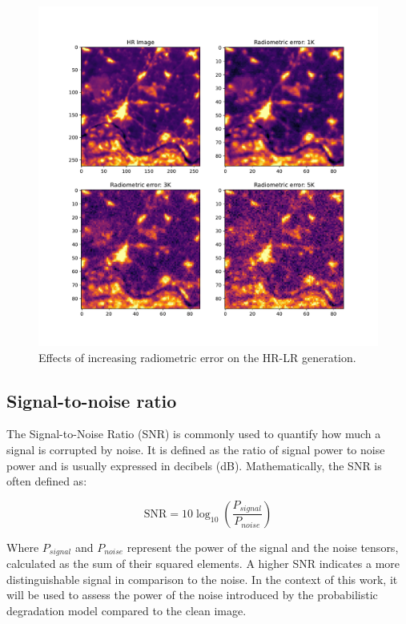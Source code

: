         \begin{figure}[h!]
            \centering
            \includegraphics[width=\textwidth]{Includes/4-radiometric_noise_example.pdf}
            \caption{Effects of increasing radiometric error on the HR-LR generation.}
            \label{fig:4-radiometric_noise_example}
        \end{figure}
        
    

    \subsection{Signal-to-noise ratio }

        The Signal-to-Noise Ratio (SNR) is commonly used to quantify how much a signal is corrupted by noise. It is defined as the ratio of signal power to noise power and is usually expressed in decibels (dB). Mathematically, the SNR is often defined as:

        \[ \text{SNR} = 10 \log_{10} \left( \frac{P_{signal}}{P_{noise}} \right) \]

        Where $P_{signal}$ and $P_{noise}$ represent the power of the signal and the noise tensors, calculated as the sum of their squared elements.
        A higher SNR indicates a more distinguishable signal in comparison to the noise. In the context of this work, it will be used to assess the power of the noise introduced by the probabilistic degradation model compared to the clean image.

